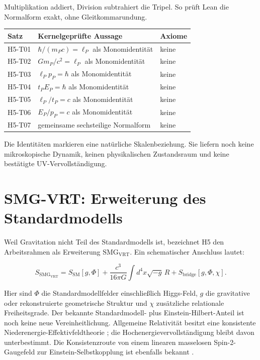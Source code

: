 \documentclass[11pt,a4paper]{article}
\newcommand{\SMGVRT}{\ensuremath{\mathrm{SMG}_{\mathrm{VRT}}}}
\begin{document}
Multiplikation addiert, Division subtrahiert die Tripel. So prüft Lean die
Normalform exakt, ohne Gleitkommarundung.

\begin{longtable}{p{}p{}p{}}
\toprule
Satz & Kernelgeprüfte Aussage & Axiome \\
\midrule
\endhead
H5-T01 & \(\hbar/(m_Pc)=\ell_P\) als Monomidentität & keine \\
H5-T02 & \(Gm_P/c^2=\ell_P\) als Monomidentität & keine \\
H5-T03 & \(\ell_Pp_P=\hbar\) als Monomidentität & keine \\
H5-T04 & \(t_PE_P=\hbar\) als Monomidentität & keine \\
H5-T05 & \(\ell_P/t_P=c\) als Monomidentität & keine \\
H5-T06 & \(E_P/p_P=c\) als Monomidentität & keine \\
H5-T07 & gemeinsame sechsteilige Normalform & keine \\
\bottomrule
\end{longtable}

Die Identitäten markieren eine natürliche Skalenbeziehung. Sie liefern noch
keine mikroskopische Dynamik, keinen physikalischen Zustandsraum und keine
bestätigte UV-Vervollständigung.

\section{SMG-VRT: Erweiterung des Standardmodells}

Weil Gravitation nicht Teil des Standardmodells ist, bezeichnet H5 den
Arbeitsrahmen als Erweiterung \SMGVRT. Ein schematischer Anschluss lautet:

\[
S_{\SMGVRT}
=S_{\mathrm{SM}}[g,\Phi]
+\frac{c^3}{16\pi G}\int d^4x\sqrt{-g}\,R
+S_{\mathrm{bridge}}[g,\Phi,\chi].
\]

Hier sind \(\Phi\) die Standardmodellfelder einschließlich Higgs-Feld,
\(g\) die gravitative oder rekonstruierte geometrische Struktur und \(\chi\)
zusätzliche relationale Freiheitsgrade. Der bekannte Standardmodell- plus
Einstein-Hilbert-Anteil ist noch keine neue Vereinheitlichung. Allgemeine
Relativität besitzt eine konsistente Niederenergie-Effektivfeldtheorie
\cite{donoghue1994}; die Hochenergievervollständigung bleibt davon
unterbestimmt. Die Konsistenzroute von einem linearen masselosen
Spin-2-Gaugefeld zur Einstein-Selbstkopplung ist ebenfalls bekannt
\cite{deser1970}.
\end{document}
